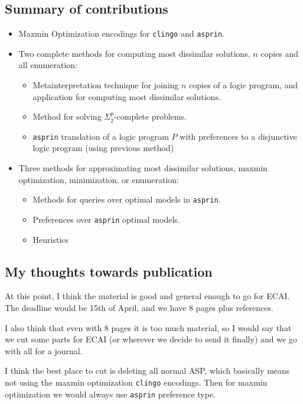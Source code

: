 \documentclass[a4paper,10pt]{article}
\begin{document}
\subsection{Summary of contributions}

\begin{itemize}
\item
Maxmin Optimization encodings for \texttt{clingo} and \texttt{asprin}.
\item
Two complete methods for computing most dissimilar solutions, 
$n$ copies and all enumeration:
\begin{itemize}
    \item
    Metainterpretation technique for joining $n$ copies of a logic program, 
    and application for computing most dissimilar solutions.
    \item
    Method for solving $\Sigma^p_2$-complete problems.
    \item
    \texttt{asprin} translation of a logic program $P$ with preferences
    to a disjunctive logic program (using previous method)
\end{itemize}
\item
Three methods for approximating most dissimilar solutions, 
maxmin optimization, minimization, or enumeration:
\begin{itemize}
    \item
    Methods for queries over optimal models in \texttt{asprin}.
    \item
    Preferences over \texttt{asprin} optimal models.
    \item
    Heuristics
\end{itemize}
\end{itemize}

\subsection{My thoughts towards publication}

At this point, I think the material is good and general enough to go for ECAI. 
The deadline would be 15th of April, and we have 8 pages plus references.

I also think that even with 8 pages it is too much material, 
so I would say that we cut some parts for ECAI (or wherever we decide to send it finally)
and we go with all for a journal.

I think the best place to cut is deleting all normal ASP, 
which basically means not using the maxmin optimization \texttt{clingo} encodings.
Then for maxmin optimization we would always use \texttt{asprin} preference type.
\end{document}
